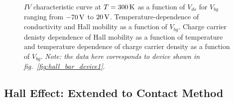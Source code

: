 \begin{figure}[ht]
	\qquad
	\caption[Output characteristics and channel properties of lightly $p$-doped  with 2D/2D contacts]{\protect{} $IV$ characteristic curve at $T=300\,\mathrm{K}$ as a function of $V_{ds}$ for $V_{bg}$ ranging from $-70\,\mathrm{V}$ to $20\,\mathrm{V}$. \protect{} Temperature-dependence of conductivity and \protect{} Hall mobility as a function of $V_{bg}$. \protect{} Charge carrier denisty dependence of Hall mobility as a function of temperature and \protect{} temperature dependence of charge carrier density as a function of $V_{bg}$. \emph{Note: the data here corresponds to device shown in fig.~\ref{fig:hall_bar_device1}}.}
	\label{fig:hall_measurement_data_lightly}
\end{figure}

\subsection{Hall Effect: Extended to Contact Method}\label{subsec:hall_degenerate}

